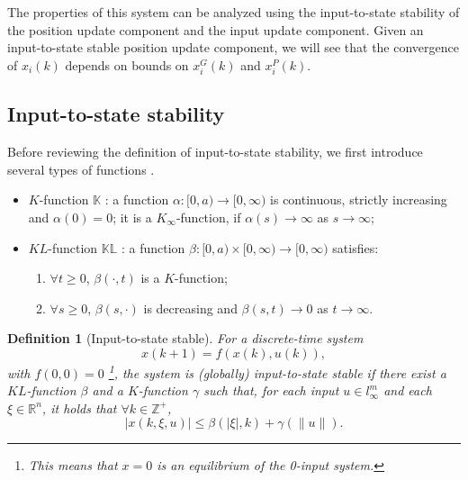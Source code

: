 \documentclass{sig-alternate}
\newtheorem{mydef}{Definition}
\begin{document}
The properties of this system can be analyzed using the input-to-state stability of the position update component and the input update component. 
Given an input-to-state stable position update component, we will see that the convergence of $ x_{i}(k) $ depends on bounds on $ x^{G}_{i}(k) $ and $ x^{P}_{i}(k) $.

\subsection{Input-to-state stability}

Before reviewing the definition of input-to-state stability, we first introduce several types of functions \cite{Jiang2001857}.
\begin{itemize}
	\item $ K $-function $ \mathbb{K} $ : a function $ \alpha  : [ 0, a ) \rightarrow [ 0, \infty ) $ is continuous, strictly increasing and $ \alpha (0) = 0 $; it is a $ K_{\infty} $-function, if $ \alpha (s) \rightarrow \infty $ as $ s \rightarrow \infty $;
	\item $ KL $-function $ \mathbb{KL} $ : a function $ \beta : [ 0, a ) \times [ 0 , \infty ) \rightarrow [ 0, \infty ) $ satisfies:
	\begin{enumerate}
		\item $ \forall t \geq 0 $, $ \beta (\cdot , t ) $ is a $ K $-function;
		\item $ \forall s \geq 0 $, $ \beta (s, \cdot) $ is decreasing and $ \beta(s,t) \rightarrow 0 $ as $ t \rightarrow \infty $.
	\end{enumerate}
\end{itemize}

\begin{mydef}[Input-to-state stable]\cite{Jiang2001857}
\label{def:iss}
For a discrete-time system
\begin{equation}
\label{eq:dis_nonlinear}
x(k+1) = f( x(k) , u(k) ),
\end{equation}
with $ f(0,0) = 0 $
\footnote{This means that $ x = 0 $ is an equilibrium of the 0-input system.}, the system is \emph{(globally) input-to-state stable} if there exist a $ KL $-function $ \beta  $ and a $ K $-function $ \gamma $ such that, for each input $ u \in l^{m}_{\infty} $ and each $ \xi \in \mathbb{R}^{n} $, it holds that $  \forall k \in \mathbb{Z}^{+} $,
\begin{equation}
\label{eq:def_iss}
| x(k, \xi, u) | \leq \beta (| \xi |, k) + \gamma (\lVert u \rVert).
\end{equation}
\end{mydef}
\end{document}
